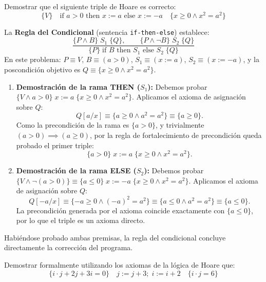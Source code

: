 \begin{ejercicio}
Demostrar que el siguiente triple de Hoare es correcto:
\[
\{V\} \quad \text{if } a > 0 \text{ then } x := a \text{ else } x := -a \quad \{x \ge 0 \land x^2 = a^2\}
\]
\end{ejercicio}

\begin{solucion}
La \textbf{Regla del Condicional} (sentencia \texttt{if-then-else}) establece:
\[
\frac{\{P \land B\} \; S_1 \; \{Q\}, \qquad \{P \land \neg B\} \; S_2 \; \{Q\}}{\{P\} \; \text{if } B \text{ then } S_1 \text{ else } S_2 \; \{Q\}}
\]
En este problema: $P \equiv V$, $B \equiv (a > 0)$, $S_1 \equiv (x := a)$, $S_2 \equiv (x := -a)$, y la poscondición objetivo es $Q \equiv \{x \ge 0 \land x^2 = a^2\}$.

\begin{enumerate}[leftmargin=*]
    \item \textbf{Demostración de la rama THEN ($S_1$):}
    Debemos probar $\{V \land a > 0\} \; x := a \; \{x \ge 0 \land x^2 = a^2\}$.
    Aplicamos el axioma de asignación sobre $Q$:
    \[
    Q[a / x] \equiv \{a \ge 0 \land a^2 = a^2\} \equiv \{a \ge 0\}.
    \]
    Como la precondición de la rama es $\{a > 0\}$, y trivialmente $(a > 0) \implies (a \ge 0)$, por la regla de fortalecimiento de precondición queda probado el primer triple:
    \[
    \{a > 0\} \; x := a \; \{x \ge 0 \land x^2 = a^2\}.
    \]

    \item \textbf{Demostración de la rama ELSE ($S_2$):}
    Debemos probar $\{V \land \neg(a > 0)\} \equiv \{a \le 0\} \; x := -a \; \{x \ge 0 \land x^2 = a^2\}$.
    Aplicamos el axioma de asignación sobre $Q$:
    \[
    Q[-a / x] \equiv \{-a \ge 0 \land (-a)^2 = a^2\} \equiv \{a \le 0 \land a^2 = a^2\} \equiv \{a \le 0\}.
    \]
    La precondición generada por el axioma coincide exactamente con $\{a \le 0\}$, por lo que el triple es un axioma directo.
\end{enumerate}

Habiéndose probado ambas premisas, la regla del condicional concluye directamente la corrección del programa.
\end{solucion}

\begin{ejercicio}
Demostrar formalmente utilizando los axiomas de la lógica de Hoare que:
\[
\{i \cdot j + 2j + 3i = 0\} \quad j := j + 3; \; i := i + 2 \quad \{i \cdot j = 6\}
\]
\end{ejercicio}

